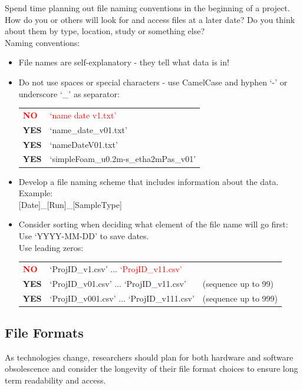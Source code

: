 Spend time planning out file naming conventions in the beginning of a project. How do you or others will look for and access files at a later date? Do you think about them by type, location, study or something else? \\[8pt]
Naming conventions:
\begin{itemize}
  \item File names are self-explanatory - they tell what data is in!
  \item Do not use spaces or special characters - use CamelCase and hyphen
        ‘-’ or underscore ‘\_’ as separator: \\
        \begin{tabular}{ll}
          \textcolor{red}{\textbf{NO}}  & \textcolor{red}{‘name date v1.txt’} \\
          \textbf{YES} & ‘name\_date\_v01.txt’ \\
          \textbf{YES} & ‘nameDateV01.txt’ \\
          \textbf{YES} & ‘simpleFoam\_u0.2m-s\_etha2mPas\_v01’ \\
        \end{tabular}
  \item Develop a file naming scheme that includes information about the data.
        Example: \\
        {[Date]}\_{[Run]}\_{[SampleType]}
  \item Consider sorting when deciding what element of the file name will
        go first: \\
        Use ‘YYYY-MM-DD’ to save dates. \\
        Use leading zeros: \\
        \begin{tabular}{lll}
          \textcolor{red}{\textbf{NO}}  & ‘ProjID\_v1.csv’  	...  	\textcolor{red}{‘ProjID\_v11.csv’} & \\
          \textbf{YES} & ‘ProjID\_v01.csv’ 	... 	‘ProjID\_v11.csv’
             & (sequence up to 99) \\
          \textbf{YES} & ‘ProjID\_v001.csv’ 	...	‘ProjID\_v111.csv’
             & (sequence up to 999) \\
        \end{tabular}
\end{itemize}

\subsection{File Formats}
As technologies change, researchers should plan for both hardware and software obsolescence and consider the longevity of their file format choices to ensure long term readability and access.


